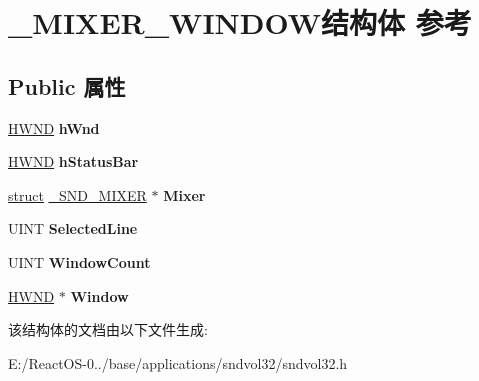 \hypertarget{struct___m_i_x_e_r___w_i_n_d_o_w}{}\section{\+\_\+\+M\+I\+X\+E\+R\+\_\+\+W\+I\+N\+D\+O\+W结构体 参考}
\label{struct___m_i_x_e_r___w_i_n_d_o_w}
\subsection*{Public 属性}
\begin{DoxyCompactItemize}
\item 
\mbox{\label{struct___m_i_x_e_r___w_i_n_d_o_w_a39896380d9719d01e95f61e733bf4838}} 
\hyperlink{interfacevoid}{H\+W\+ND} {\bfseries h\+Wnd}
\item 
\mbox{\label{struct___m_i_x_e_r___w_i_n_d_o_w_a75568e8a11c9607aae6d22a5d997f9b9}} 
\hyperlink{interfacevoid}{H\+W\+ND} {\bfseries h\+Status\+Bar}
\item 
\mbox{\label{struct___m_i_x_e_r___w_i_n_d_o_w_a23fa5c7ac7b5cb45c0c1029b8bdc526d}} 
\hyperlink{interfacestruct}{struct} \hyperlink{struct___s_n_d___m_i_x_e_r}{\+\_\+\+S\+N\+D\+\_\+\+M\+I\+X\+ER} $\ast$ {\bfseries Mixer}
\item 
\mbox{\label{struct___m_i_x_e_r___w_i_n_d_o_w_afc9cbe19e27e6fa7f18fa01961f1b872}} 
U\+I\+NT {\bfseries Selected\+Line}
\item 
\mbox{\label{struct___m_i_x_e_r___w_i_n_d_o_w_ae3bd2a865e83573235c33981a32e7780}} 
U\+I\+NT {\bfseries Window\+Count}
\item 
\mbox{\label{struct___m_i_x_e_r___w_i_n_d_o_w_ab093285201570be93235cdd4eabf36aa}} 
\hyperlink{interfacevoid}{H\+W\+ND} $\ast$ {\bfseries Window}
\end{DoxyCompactItemize}


该结构体的文档由以下文件生成\+:\begin{DoxyCompactItemize}
\item 
E\+:/\+React\+O\+S-\/0../base/applications/sndvol32/sndvol32.\+h\end{DoxyCompactItemize}
